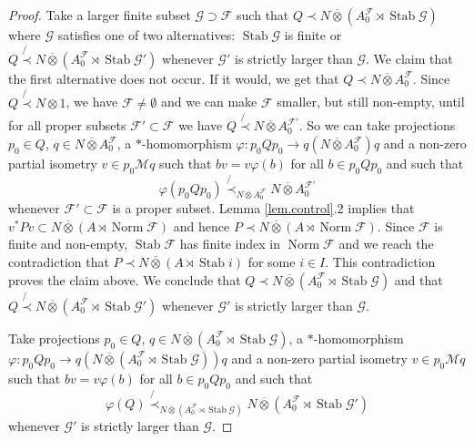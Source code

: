 \documentclass[a4paper,11pt]{amsart}
\numberwithin{equation}{section}
\begin{document}
\begin{proof}
Take a larger finite subset ${\mathcal{G}} \supset {\mathcal{F}}$ such that $Q {\prec} N {\mathbin{\overline{\otimes}}} (A_0^{\mathcal{F}} \rtimes {\operatorname{Stab}} {\mathcal{G}})$ where ${\mathcal{G}}$ satisfies one of two alternatives: ${\operatorname{Stab}} {\mathcal{G}}$ is finite or $Q \not{\prec} N {\mathbin{\overline{\otimes}}} (A_0^{\mathcal{F}} \rtimes {\operatorname{Stab}} {\mathcal{G}}')$ whenever ${\mathcal{G}}'$ is strictly larger than ${\mathcal{G}}$. We claim that the first alternative does not occur. If it would, we get that $Q {\prec} N {\mathbin{\overline{\otimes}}} A_0^{\mathcal{F}}$. Since $Q \not{\prec} N {\otimes} 1$, we have ${\mathcal{F}} \neq \emptyset$ and we can make ${\mathcal{F}}$ smaller, but still non-empty, until for all proper subsets ${\mathcal{F}}' \subset {\mathcal{F}}$ we have $Q \not{\prec} N {\mathbin{\overline{\otimes}}} A_0^{{\mathcal{F}}'}$. So we can take projections $p_0 \in Q$, $q \in N {\mathbin{\overline{\otimes}}} A_0^{\mathcal{F}}$, a $*$-homomorphism ${\varphi} : p_0 Q p_0 {\rightarrow} q(N {\mathbin{\overline{\otimes}}} A_0^{\mathcal{F}})q$ and a non-zero partial isometry $v \in p_0 {\mathcal{M}} q$ such that $b v = v {\varphi}(b)$ for all $b \in p_0 Q p_0$ and such that
$${\varphi}(p_0 Q p_0) \not{\prec}_{N {\mathbin{\overline{\otimes}}} A_0^{\mathcal{F}}} N {\mathbin{\overline{\otimes}}} A_0^{{\mathcal{F}}'}$$
whenever ${\mathcal{F}}' \subset {\mathcal{F}}$ is a proper subset. Lemma \ref{lem.control}.2 implies that $v^* P v \subset N {\mathbin{\overline{\otimes}}} (A \rtimes {\operatorname{Norm}} {\mathcal{F}})$ and hence $P {\prec} N {\mathbin{\overline{\otimes}}} (A \rtimes {\operatorname{Norm}} {\mathcal{F}})$. Since ${\mathcal{F}}$ is finite and non-empty, ${\operatorname{Stab}} {\mathcal{F}}$ has finite index in ${\operatorname{Norm}} {\mathcal{F}}$ and we reach the contradiction that $P {\prec} N {\mathbin{\overline{\otimes}}} (A \rtimes {\operatorname{Stab}} i)$ for some $i \in I$. This contradiction proves the claim above. We conclude that $Q {\prec} N {\mathbin{\overline{\otimes}}} (A_0^{\mathcal{F}} \rtimes {\operatorname{Stab}} {\mathcal{G}})$ and that $Q \not{\prec} N {\mathbin{\overline{\otimes}}} (A_0^{\mathcal{F}} \rtimes {\operatorname{Stab}} {\mathcal{G}}')$ whenever ${\mathcal{G}}'$ is strictly larger than ${\mathcal{G}}$.

Take projections $p_0 \in Q$, $q \in N {\mathbin{\overline{\otimes}}} (A_0^{\mathcal{F}} \rtimes {\operatorname{Stab}} {\mathcal{G}})$, a $*$-homomorphism ${\varphi} : p_0 Q p_0 {\rightarrow} q(N {\mathbin{\overline{\otimes}}} (A_0^{\mathcal{F}} \rtimes {\operatorname{Stab}} {\mathcal{G}}))q$ and a non-zero partial isometry $v \in p_0 {\mathcal{M}} q$ such that $b v = v {\varphi}(b)$ for all $b \in p_0 Q p_0$ and such that
\begin{equation}\label{eq.leukeinbedding}
{\varphi}(Q) \not{\prec}_{N {\mathbin{\overline{\otimes}}} (A_0^{\mathcal{F}} \rtimes {\operatorname{Stab}} {\mathcal{G}})} N {\mathbin{\overline{\otimes}}} (A_0^{\mathcal{F}} \rtimes {\operatorname{Stab}} {\mathcal{G}}')
\end{equation}
whenever ${\mathcal{G}}'$ is strictly larger than ${\mathcal{G}}$.


\end{proof}
\end{document}
